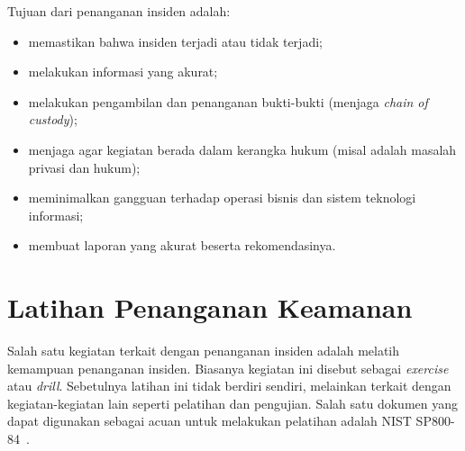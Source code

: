 Tujuan dari penanganan insiden adalah:
\begin{itemize}
   \item memastikan bahwa insiden terjadi atau tidak terjadi;
   \item melakukan informasi yang akurat;
   \item melakukan pengambilan dan penanganan bukti-bukti
      (menjaga {\em chain of custody});
   \item menjaga agar kegiatan berada dalam kerangka hukum
      (misal adalah masalah privasi dan hukum);
   \item meminimalkan gangguan terhadap operasi bisnis dan
      sistem teknologi informasi;
   \item membuat laporan yang akurat beserta rekomendasinya.
\end{itemize}


\section{Latihan Penanganan Keamanan}
Salah satu kegiatan terkait dengan penanganan insiden adalah melatih kemampuan
penanganan insiden. Biasanya kegiatan ini disebut sebagai {\em exercise} atau
{\em drill}. Sebetulnya latihan ini tidak berdiri sendiri, melainkan terkait
dengan kegiatan-kegiatan lain seperti pelatihan dan pengujian.
Salah satu dokumen yang dapat digunakan sebagai acuan untuk melakukan pelatihan
adalah NIST SP800-84~\cite{sp800-84}.
